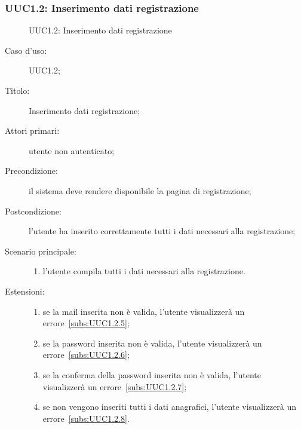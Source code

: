 \documentclass[../../../analisi-dei-requisiti.tex]{subfiles}
\begin{document}
\subsubsection{UUC1.2: Inserimento dati registrazione}%
\label{subs:UUC1.2}

\begin{figure}[H]
  \centering
  \caption{UUC1.2: Inserimento dati registrazione}%
  \label{fig:uuc1_2}
\end{figure}

\begin{description}
  \item[Caso d’uso:] UUC1.2;
  \item[Titolo:] Inserimento dati registrazione;
  \item[Attori primari:] utente non autenticato;
  \item[Precondizione:] il sistema deve rendere disponibile la pagina di registrazione;
  \item[Postcondizione:] l'utente ha inserito correttamente tutti i dati necessari alla registrazione;
  \item[Scenario principale:]
        \begin{enumerate}
          \item l'utente compila tutti i dati necessari alla registrazione.
        \end{enumerate}
  \item[Estensioni:]
        \begin{enumerate}
          \item se la mail inserita non è valida, l'utente visualizzerà un errore~\ref{subs:UUC1.2.5};
          \item se la password inserita non è valida, l'utente visualizzerà un errore~\ref{subs:UUC1.2.6};
          \item se la conferma della password inserita non è valida, l'utente visualizzerà un errore~\ref{subs:UUC1.2.7};
          \item se non vengono inseriti tutti i dati anagrafici, l'utente visualizzerà un errore~\ref{subs:UUC1.2.8}.
        \end{enumerate}
\end{description}
\end{document}
